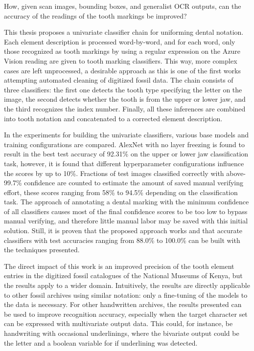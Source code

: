 \documentclass[english,twoside,openright]{UH_DS_MSc}
\begin{document}
How, given scan images, bounding boxes, and generalist OCR outputs, can the accuracy of the readings of the tooth markings be improved?

This thesis proposes a univariate classifier chain for
uniforming dental notation. Each element description is processed 
word-by-word, and for each word, only those recognized as tooth markings
by using a regular expression on the Azure Vision reading are given to tooth marking
classifiers. This way, more complex cases are left unprocessed, a desirable
approach as this is one of the first works attempting automated cleaning 
of digitized fossil data. The chain consists of three classifiers: the first one detects the tooth type specifying the letter on the image, the second detects whether the tooth is from the upper or lower jaw,
and the third recognizes the index number. Finally, all these inferences are combined into tooth notation and concatenated to a corrected element 
description. 

In the experiments for building the univariate classifiers, various base models and training configurations are compared.
AlexNet with no layer freezing is found to result in the best test accuracy of 92.31\% on the 
upper or lower jaw classification task, however, it is found that different hyperparameter 
configurations influence the scores by up to 10\%. 
Fractions of test images classified correctly with above-99.7\% confidence are 
counted to estimate the amount of saved manual verifying effort, these scores ranging 
from 58\% to 94.5\% depending on the classification task.
The approach of annotating a dental marking with the minimum 
confidence of all classifiers causes most of the final confidence scores 
to be too low to bypass manual verifying, and therefore little manual labor may be 
saved with this initial solution. Still, it is proven that the proposed approach works and that 
accurate classifiers with test accuracies ranging from 88.0\% to 100.0\% can be built 
with the techniques presented.

The direct impact of this work is an improved precision of the tooth element entries in the digitized 
fossil catalogues of the National Museums of Kenya, but the results apply to a wider domain.
Intuitively, the results are directly applicable to other fossil archives using similar notation: only a fine-tuning of the 
models to the data is necessary.
For other handwritten archives, the results presented can be used to improve recognition accuracy, especially when the target character set can be expressed with multivariate output data. This could, for 
instance, be handwriting with occasional underlinings, where the bivariate output could be the letter and a boolean variable for if underlining was detected.
\end{document}
